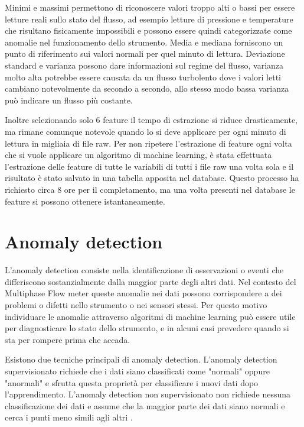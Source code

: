 Minimi e massimi permettono di riconoscere valori troppo alti o bassi per essere letture reali sullo stato del flusso, ad esempio letture di pressione e temperature che risultano fisicamente impossibili e possono essere quindi categorizzate come anomalie nel funzionamento dello strumento. Media e mediana forniscono un punto di riferimento sui valori normali per quel minuto di lettura. Deviazione standard e varianza possono dare informazioni sul regime del flusso, varianza molto alta potrebbe essere causata da un flusso turbolento dove i valori letti cambiano notevolmente da secondo a secondo, allo stesso modo bassa varianza può indicare un flusso più costante.

Inoltre selezionando solo 6 feature il tempo di estrazione si riduce drasticamente, ma rimane comunque notevole quando lo si deve applicare per ogni minuto di lettura in migliaia di file raw.
Per non ripetere l'estrazione di feature ogni volta che si vuole applicare un algoritmo di machine learning, è stata effettuata l'estrazione delle feature di tutte le variabili di tutti i file raw una volta sola e il risultato è stato salvato in una tabella apposita nel database. Questo processo ha richiesto circa 8 ore per il completamento, ma una volta presenti nel database le feature si possono ottenere istantaneamente.

\section{Anomaly detection}

L'anomaly detection consiste nella identificazione di osservazioni o eventi che differiscono sostanzialmente dalla maggior parte degli altri dati. Nel contesto del Multiphase Flow meter queste anomalie nei dati possono corrispondere a dei problemi o difetti nello strumento o nei sensori stessi. Per questo motivo individuare le anomalie attraverso algoritmi di machine learning può essere utile per diagnosticare lo stato dello strumento, e in alcuni casi prevedere quando si sta per rompere prima che accada.

Esistono due tecniche principali di anomaly detection. L'anomaly detection supervisionato richiede che i dati siano classificati come "normali" oppure "anormali" e sfrutta questa proprietà per classificare i nuovi dati dopo l'apprendimento. L'anomaly detection non supervisionato non richiede nessuna classificazione dei dati e assume che la maggior parte dei dati siano normali e cerca i punti  meno simili agli altri \cite{AnomalyDetection}.

